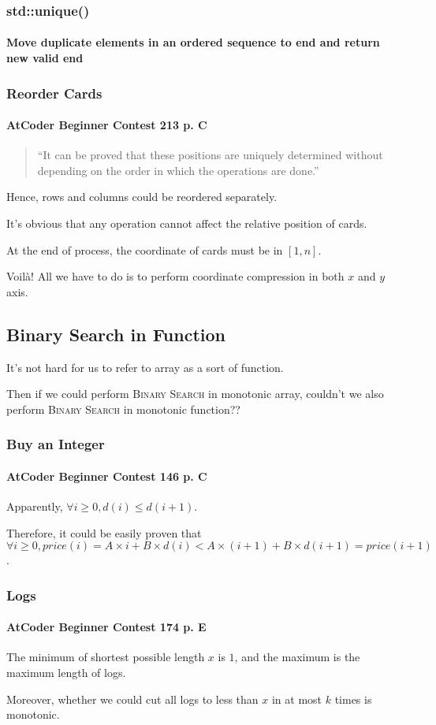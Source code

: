 \documentclass{beamer}
\begin{document}
\frame
{
	\frametitle{\ttfamily std::unique()}
	\framesubtitle{Move duplicate elements in an ordered sequence to end and return new valid end}
	
	
}

\frame
{
	\frametitle{Reorder Cards}
	\framesubtitle{AtCoder Beginner Contest 213 p. C}
	
	\begin{quote}
		``It can be proved that these positions are uniquely determined without depending on the order in which the operations are done.''
	\end{quote}
	
	\pause
	
	Hence, rows and columns could be reordered separately.\pause
	
	It's obvious that any operation cannot affect the relative position of cards.\pause
	
	At the end of process, the coordinate of cards must be in $[1, n]$.\pause
	
	Voil\`{a}! All we have to do is to perform coordinate compression in both $x$ and $y$ axis.
}

\subsection{Binary Search in Function}

\frame
{
	It's not hard for us to refer to array as a sort of function.\pause
	
	Then if we could perform \textsc{Binary Search} in monotonic array, couldn't we also perform \textsc{Binary Search} in monotonic function??
}

\frame
{
	\frametitle{Buy an Integer}
	\framesubtitle{AtCoder Beginner Contest 146 p. C}
	
	Apparently, $\forall i\geq 0, d(i)\leq d(i+1)$.\pause
	
	Therefore, it could be easily proven that $\forall i\geq 0, price(i) = A\times i+B\times d(i) < A\times(i+1)+B\times d(i+1) = price(i+1)$.\pause
}

\frame
{
	\frametitle{Logs}
	\framesubtitle{AtCoder Beginner Contest 174 p. E}
	
	The minimum of shortest possible length $x$ is $1$, and the maximum is the maximum length of logs.\pause
	
	Moreover, whether we could cut all logs to less than $x$ in at most $k$ times is monotonic.
}
\end{document}
